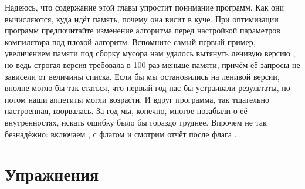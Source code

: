 Надеюсь, что содержание этой главы упростит понимание
программ. Как они вычисляются, куда идёт память,
почему она висит в куче. При оптимизации программ
предпочитайте изменение алгоритма перед настройкой 
параметров компилятора под плохой алгоритм. 
Вспомните самый первый пример, увеличением памяти
под сборку мусора нам удалось вытянуть ленивую
версию , но ведь строгая версия требовала
в 100 раз меньше памяти, причём её запросы не зависели
от величины списка. Если бы мы остановились на ленивой
версии, вполне могло бы так статься, что первый год
нас бы устраивали результаты, но потом
наши аппетиты могли возрасти. И вдруг программа,
так тщательно настроенная, взорвалась. За год
мы, конечно, многое позабыли о её внутренностях,
искать ошибку было бы гораздо труднее. Впрочем
не так безнадёжно: включаем , 
с флагом  и смотрим отчёт после флага .

    
\section{Упражнения}

